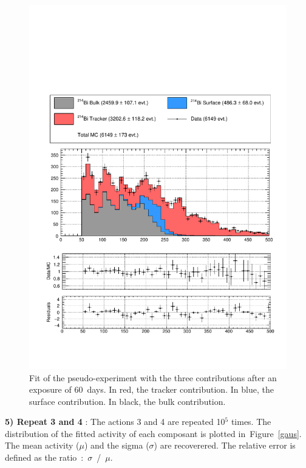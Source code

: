 \documentclass[main.tex]{subfiles}
\begin{document}
\begin{figure}[h!]
\begin{center}
\includegraphics[scale=0.5]{pictures/Chap5/fit_exposure_60.pdf}
\caption{Fit of the pseudo-experiment with the three contributions after an exposure of 60~days. In red, the tracker contribution. In blue, the surface contribution. In black, the bulk contribution.}
\label{fit-pseudo-experiment}
\end{center}
\end{figure}


\bigskip


\noindent \textbf{5) Repeat 3 and 4} : The actions 3 and 4 are repeated 10$^\text{5}$ times. The distribution of the fitted activity of each composant is plotted in~Figure~\ref{gaus}. The mean activity ($\mu$) and the sigma ($\sigma$) are recoverered. The relative error is defined as the ratio~:~$\sigma$~/~$\mu$.
\end{document}

